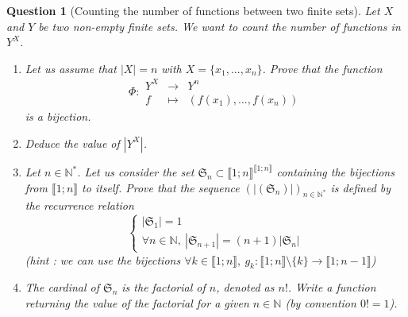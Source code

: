\documentclass[]{article}
\newtheorem{question}{Question}
\newcommand{\N}{\mathbb{N}}
\newcommand{\card}[1]{| #1 |}
\begin{document}
\begin{question}[Counting the number of functions between two finite sets]
	Let $X$ and $Y$ be two non-empty finite sets. We want to count the number of functions in $Y^X$.
	\begin{enumerate}[label=\alph*.]
		\item Let us assume that $\card{X} = n$ with $X = \{x_1,...,x_n\}$. Prove that the function
		\begin{equation*}
			\Phi : \begin{array}{lcl}
				Y^X&\longrightarrow&Y^n\\
				f&\longmapsto& (f(x_1),...,f(x_n))
			\end{array}
		\end{equation*}
		is a bijection.
		\item Deduce the value of $\card{Y^X}$.
		\item Let $n\in \N^*$. Let us consider the set $\mathfrak{S}_n\subset \llbracket 1;n\rrbracket^{\llbracket 1;n\rrbracket}$ containing the bijections from $\llbracket 1;n\rrbracket$ to itself. Prove that the sequence $(\card{(\mathfrak{S}_n)})_{n\in \N^*}$ is defined by the recurrence relation
		\begin{equation*}
			\left\{\begin{array}{l}
				\card{\mathfrak{S}_1} = 1\\
				\forall n\in \N,~\card{\mathfrak{S}_{n+1}} = (n+1)\card{\mathfrak{S}_n}
			\end{array}\right.
		\end{equation*}
		\textit{(hint : we can use the bijections $\forall k\in \llbracket 1;n\rrbracket,~ g_k:\llbracket 1;n\rrbracket \setminus \{k\}\rightarrow \llbracket 1;n-1\rrbracket$)}
		\item The cardinal of $\mathfrak{S}_n$ is the factorial of $n$, denoted as $n!$. Write a function returning the value of the factorial for a given $n\in \N$ (by convention $0! = 1$).
	\end{enumerate}
\end{question}
\end{document}
